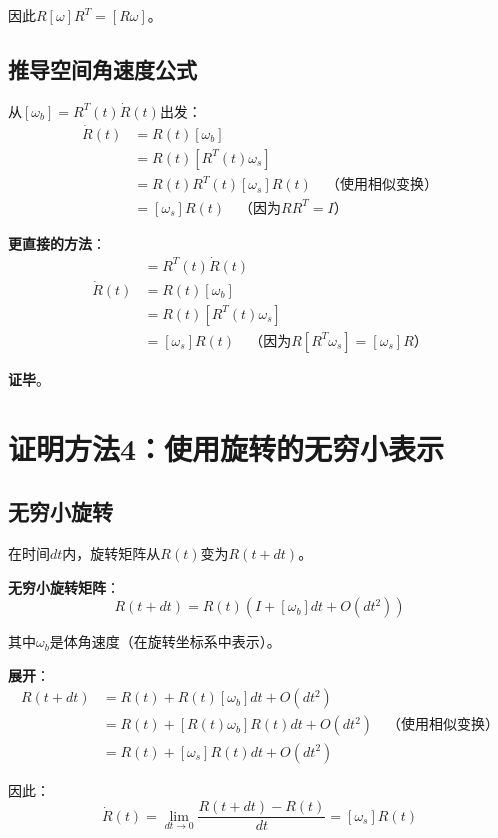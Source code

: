 \documentclass[12pt,a4paper]{article}
\begin{document}
因此$R [\omega] R^T = [R \omega]$。

\subsection{推导空间角速度公式}

从$[\omega_b] = R^T(t) \dot{R}(t)$出发：
\begin{align}
\dot{R}(t) &= R(t) [\omega_b] \\
&= R(t) [R^T(t) \omega_s] \\
&= R(t) R^T(t) [\omega_s] R(t) \quad \text{（使用相似变换）} \\
&= [\omega_s] R(t) \quad \text{（因为$R R^T = I$）}
\end{align}

\textbf{更直接的方法}：
\begin{align}
[\omega_b] &= R^T(t) \dot{R}(t) \\
\dot{R}(t) &= R(t) [\omega_b] \\
&= R(t) [R^T(t) \omega_s] \\
&= [\omega_s] R(t) \quad \text{（因为$R [R^T \omega_s] = [\omega_s] R$）}
\end{align}

\textbf{证毕}。

\section{证明方法4：使用旋转的无穷小表示}

\subsection{无穷小旋转}

在时间$dt$内，旋转矩阵从$R(t)$变为$R(t+dt)$。

\textbf{无穷小旋转矩阵}：
\begin{equation}
R(t+dt) = R(t) (I + [\omega_b] dt + O(dt^2))
\end{equation}

其中$\omega_b$是体角速度（在旋转坐标系中表示）。

\textbf{展开}：
\begin{align}
R(t+dt) &= R(t) + R(t) [\omega_b] dt + O(dt^2) \\
&= R(t) + [R(t) \omega_b] R(t) dt + O(dt^2) \quad \text{（使用相似变换）} \\
&= R(t) + [\omega_s] R(t) dt + O(dt^2)
\end{align}

因此：
\begin{equation}
\dot{R}(t) = \lim_{dt \to 0} \frac{R(t+dt) - R(t)}{dt} = [\omega_s] R(t)
\end{equation}
\end{document}
